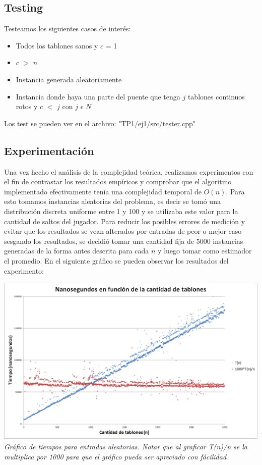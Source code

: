 \subsection{Testing}

Testeamos los siguientes casos de interés:
\begin{itemize}
	\item Todos los tablones sanos y $c$ = 1
	\item $c$ $>$ $n$
	\item Instancia generada aleatoriamente
	\item Instancia donde haya una parte del puente que tenga $j$ tablones continuos rotos y $c$ $<$ $j$ con $j$ $\epsilon$ $N$ 
\end{itemize}


Los test se pueden ver en el archivo: "TP1/ej1/src/tester.cpp"


\subsection{Experimentación}
Una vez hecho el análisis de la complejidad teórica, realizamos experimentos con el fin de contrastar los resultados empíricos y comprobar que el algoritmo implementado efectivamente tenía una complejidad temporal de $O(n)$. Para esto tomamos instancias aleatorias del problema, es decir se tomó una distribución discreta uniforme entre 1 y 100 y se utilizaba este valor para la cantidad de saltos del jugador. Para reducir los posibles errores de medición y evitar que los resultados se vean alterados por entradas de peor o mejor caso sesgando los resultados, se decidió tomar una cantidad fija de 5000 instancias generadas de la forma antes descrita para cada $n$ y luego tomar como estimador el promedio. En el siguiente gráfico se pueden observar los resultados del experimento:
    \begin{center}
		\includegraphics[scale=0.50]{Imagenes/Ej1/exp1}
		\\

		\footnotesize\textit{Gráfico de tiempos para entradas aleatorias. Notar que al graficar T(n)/n se la multiplica por 1000 para que el gráfico pueda ser apreciado con fácilidad}
	\end{center}
